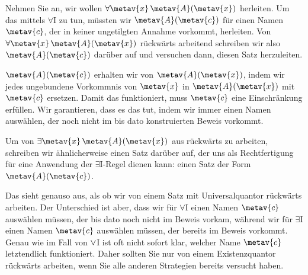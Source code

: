 Nehmen Sie an, wir wollen $\forall \metav{x}\, \atom{\metav{A}}{\metav{x}}$ herleiten. Um das mittels $\forall$I zu tun, müssten wir $\atom{\metav{A}}{\metav{c}}$ für einen Namen $\metav{c}$, der in keiner ungetilgten Annahme vorkommt, herleiten. Von $\forall \metav{x}\, \atom{\metav{A}}{\metav{x}}$ rückwärts arbeitend schreiben wir also $\atom{\metav{A}}{\metav{c}}$ darüber auf und versuchen dann, diesen Satz herzuleiten.
\begin{fitchproof}
	\ellipsesline
\end{fitchproof}
$\atom{\metav{A}}{\metav{c}}$ erhalten wir von $\atom{\metav{A}}{\metav{x}}$, indem wir jedes ungebundene Vorkommnis von $\metav{x}$ in $\atom{\metav{A}}{\metav{x}}$ mit $\metav{c}$ ersetzen. Damit das funktioniert, muss $\metav{c}$ eine Einschränkung erfüllen. Wir garantieren, dass es das tut, indem wir immer einen Namen auswählen, der noch nicht im bis dato konstruierten Beweis vorkommt.

Um von $\exists \metav{x}\, \atom{\metav{A}}{\metav{x}}$ aus rückwärts zu arbeiten, schreiben wir ähnlicherweise einen Satz darüber auf, der uns als Rechtfertigung für eine Anwendung der $\exists$I-Regel dienen kann: einen Satz der Form $\atom{\metav{A}}{\metav{c}}$. 
\begin{fitchproof}
	\ellipsesline
\end{fitchproof}
Das sieht genauso aus, als ob wir von einem Satz mit Universalquantor rückwärts arbeiten. Der Unterschied ist aber, dass wir für $\forall$I einen Namen $\metav{c}$ auswählen müssen, der bis dato noch nicht im Beweis vorkam, während wir für $\exists$I einen Namen $\metav{c}$ auswählen müssen, der bereits im Beweis vorkommt. Genau wie im Fall von $\vee$I ist oft nicht sofort klar, welcher Name $\metav{c}$ letztendlich funktioniert. Daher sollten Sie nur von einem Existenzquantor rückwärts arbeiten, wenn Sie alle anderen Strategien bereits versucht haben.

